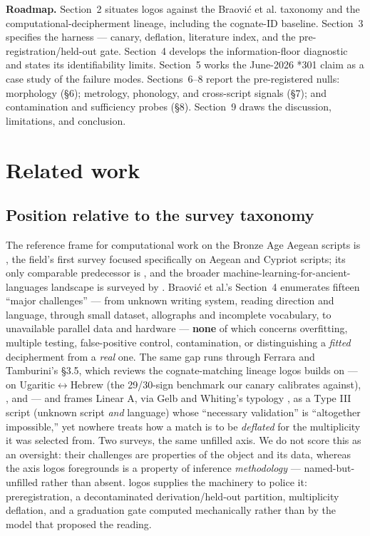 \textbf{Roadmap.} Section~2 situates logos against the Braovi\'{c} et al.
taxonomy and the computational-decipherment lineage, including the
cognate-ID baseline. Section~3 specifies the harness --- canary,
deflation, literature index, and the pre-registration/held-out gate.
Section~4 develops the information-floor diagnostic and states its
identifiability limits. Section~5 works the June-2026 *301 claim as a
case study of the failure modes. Sections~6--8 report the pre-registered
nulls: morphology (\S6); metrology, phonology, and cross-script signals
(\S7); and contamination and sufficiency probes (\S8). Section~9 draws
the discussion, limitations, and conclusion.

\section{Related work}

\subsection{Position relative to the survey taxonomy}

The reference frame for computational work on the Bronze Age Aegean
scripts is \citet[\emph{Computational Linguistics}
50(2):725--779]{braovic2024}, the field's first survey focused
specifically on Aegean and Cypriot scripts; its only comparable
predecessor is \citet{ferrara2022}, and the broader
machine-learning-for-ancient-languages landscape is surveyed by
\citet[\emph{Computational Linguistics} 49(3)]{sommerschield2023}.
Braovi\'{c} et al.'s Section~4 enumerates fifteen ``major challenges'' ---
from unknown writing system, reading direction and language, through
small dataset, allographs and incomplete vocabulary, to unavailable
parallel data and hardware --- \textbf{none} of which concerns
overfitting, multiple testing, false-positive control, contamination, or
distinguishing a \emph{fitted} decipherment from a \emph{real} one. The
same gap runs through Ferrara and Tamburini's
\citeyearpar[\emph{Lingue e Linguaggio} XXI.2:239--259]{ferrara2022}
\S3.5, which reviews the cognate-matching lineage logos builds on ---
\citet{snyder2010} on Ugaritic$\leftrightarrow$Hebrew (the 29/30-sign
benchmark our canary calibrates against), \citet{bergkirkpatrick2011},
and \citet{luo2019, luo2021} --- and frames Linear A, via Gelb and
Whiting's typology \citep{gelb1975}, as a Type III script (unknown script
\emph{and} language) whose ``necessary validation'' is ``altogether
impossible,'' yet nowhere treats how a match is to be \emph{deflated} for
the multiplicity it was selected from. Two surveys, the same unfilled
axis. We do not score this as an oversight: their challenges are
properties of the object and its data, whereas the axis logos foregrounds
is a property of inference \emph{methodology} --- named-but-unfilled
rather than absent. logos supplies the machinery to police it:
preregistration, a decontaminated derivation/held-out partition,
multiplicity deflation, and a graduation gate computed mechanically rather
than by the model that proposed the reading.

